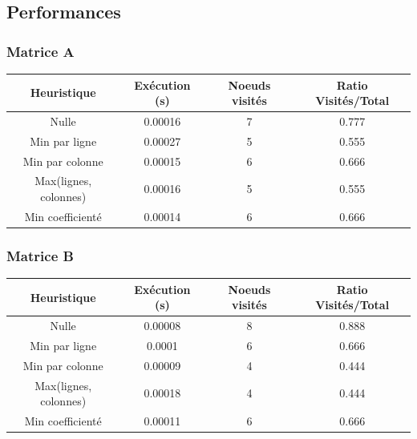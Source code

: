 \documentclass[11pt]{article} %
\begin{document}
\newpage
\subsection{Performances}

\subsubsection{Matrice A}

\begin{center}
    \begin{tabular}{|c|c|c|c|}
        \hline
        \textbf{Heuristique} & \textbf{Exécution (s)} & \textbf{Noeuds visités} & \textbf{Ratio Visités/Total} \\ \hline
        Nulle &   0.00016   &  7   &  0.777 \\ \hline
        Min par ligne &   0.00027   &  5   &  0.555 \\ \hline
        Min par colonne &   0.00015   &  6   &  0.666 \\ \hline
        Max(lignes, colonnes) &   0.00016   &  5   &  0.555 \\ \hline
        Min coefficienté &   0.00014   &  6   &  0.666 \\ \hline
    \end{tabular}
\end{center}

\subsubsection{Matrice B}

\begin{center}
    \begin{tabular}{|c|c|c|c|}
        \hline
        \textbf{Heuristique} & \textbf{Exécution (s)} & \textbf{Noeuds visités} & \textbf{Ratio Visités/Total} \\ \hline
        Nulle &   0.00008   &  8   &  0.888 \\ \hline
        Min par ligne &   0.0001   &  6   &  0.666 \\ \hline
        Min par colonne &   0.00009   &  4   &  0.444 \\ \hline
        Max(lignes, colonnes) &   0.00018   &  4   &  0.444 \\ \hline
        Min coefficienté &   0.00011   &  6   &  0.666 \\ \hline
    \end{tabular}
\end{center}
\end{document}
